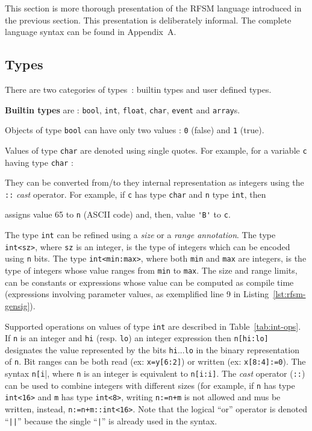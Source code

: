 This section is more thorough presentation of the RFSM language introduced in the previous
section. This presentation is deliberately informal. The complete language syntax can
be found in Appendix~A.

\subsection{Types}
\label{sec:types}

There are two categories of types~: builtin types and user defined types.

\medskip
\textbf{Builtin types} are : \texttt{bool}, \texttt{int}, \texttt{float}, \texttt{char}, \texttt{event} and
\texttt{array}s.

\step Objects of type \texttt{bool} can have only two values : \texttt{0} (false) and \texttt{1} (true).

\step Values of type \texttt{char} are
denoted using single quotes. For example, for a variable \verb|c| having type \verb|char| :
\begin{center}
\end{center}
They can be converted from/to they internal representation as integers using the \verb|::| \emph{cast}
operator. For example, if \verb|c| has type \verb|char| and \verb|n| type \verb|int|, then 
\begin{center}
\end{center}
assigns value 65 to \verb|n| (ASCII code) and, then, value \verb|'B'| to \verb|c|.


\step The type \texttt{int} can be refined using a \emph{size} or a \emph{range annotation}. The
type \verb|int<sz>|, where \verb|sz| is an integer, is the type of integers which can be encoded using
\verb|n| bits. The type \verb|int<min:max>|, where both \verb|min| and \verb|max| are integers, is
the type of integers whose value ranges from \verb|min| to \verb|max|. The size and range limits,
can be constants or expressions whose value can be computed as compile time
(expressions involving parameter values, as exemplified line 9 in Listing~\ref{lst:rfsm-gensig}).

\step Supported operations on values of type \texttt{int} are described in Table~\ref{tab:int-ops}.
If \verb|n| is an integer and \verb|hi| (resp. \verb|lo|) an integer expression then \verb|n[hi:lo]|
designates the value represented by the bits \verb|hi|...\verb|lo| in the binary representation of
\verb|n|. Bit ranges can be both read (ex: \verb|x=y[6:2]|) or written (ex: \verb|x[8:4]:=0|). The
syntax \verb|n[i||, where \verb|n| is an integer is equivalent to \verb|n[i:i]|. The \emph{cast}
operator (\verb|::|) can be used to combine integers with different sizes (for example, if \verb|n|
has type \verb|int<16>| and \verb|m| has type \verb|int<8>|, writing \verb|n:=n+m| is not allowed
and mus be written, instead, \verb|n:=n+m::int<16>|. Note that the
logical ``or'' operator is denoted ``\verb+||+'' because the single ``\verb+|+'' is already used in
the syntax.

